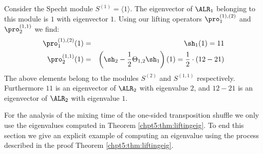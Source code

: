 \documentclass[11pt]{report}
\begin{document}
\begin{example}
	\label{chpt5:ex:difflift}
	Consider the Specht module $S^{(1)} = \langle 1 \rangle$. The 
	eigenvector of $\ALR_{1}$ belonging to this module is $1$ with 
	eigenvector $1$. Using our lifting operators $\pro_{1}^{(1),(2)}$ and $\pro_{2}^{(1,1)}$ we find:
	\begin{eqnarray*}
		\pro_{1}^{(1),(2)}(1) & = &\sh_{1} (1)  = 11 \\ 
		\pro_{2}^{(1,1)}(1) & = & \left(\sh_{2} -\frac{1}{2}\Theta_{1,2}\sh_{1}\right)(1) = 
		\frac{1}{2}\cdot(12- 21) 
	\end{eqnarray*}
	The above elements belong to the modules $S^{(2)}$ and $S^{(1,1)}$ respectively. Furthermore  $11$ is an eigenvector of $\ALR_{2}$ with eigenvalue $2$, and $12-21$ is an eigenvector of $\ALR_{2}$ with eigenvalue $1$.	
	
	
\end{example}





For the analysis of the mixing time of the one-sided transposition shuffle we only use the eigenvalues computed in Theorem \ref{chpt5:thm:liftingeig}.
To end this section we give an explicit example of computing an eigenvalue using the process described in the proof Theorem \ref{chpt5:thm:liftingeig}.
\end{document}
